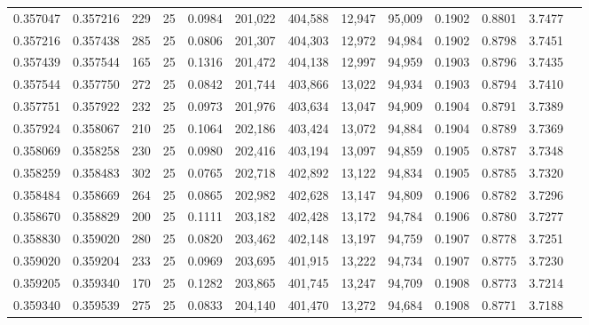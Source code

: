 \begin{tabular}{rrrrrrrrrrrrr}
0.357047 & 0.357216 &   229 &  25 &                                     0.0984 & 201,022 & 404,588 &  12,947 &  95,009 & 0.1902 & 0.8801 & 3.7477 \\
0.357216 & 0.357438 &   285 &  25 &                                     0.0806 & 201,307 & 404,303 &  12,972 &  94,984 & 0.1902 & 0.8798 & 3.7451 \\
0.357439 & 0.357544 &   165 &  25 &                                     0.1316 & 201,472 & 404,138 &  12,997 &  94,959 & 0.1903 & 0.8796 & 3.7435 \\
0.357544 & 0.357750 &   272 &  25 &                                     0.0842 & 201,744 & 403,866 &  13,022 &  94,934 & 0.1903 & 0.8794 & 3.7410 \\
0.357751 & 0.357922 &   232 &  25 &                                     0.0973 & 201,976 & 403,634 &  13,047 &  94,909 & 0.1904 & 0.8791 & 3.7389 \\
0.357924 & 0.358067 &   210 &  25 &                                     0.1064 & 202,186 & 403,424 &  13,072 &  94,884 & 0.1904 & 0.8789 & 3.7369 \\
0.358069 & 0.358258 &   230 &  25 &                                     0.0980 & 202,416 & 403,194 &  13,097 &  94,859 & 0.1905 & 0.8787 & 3.7348 \\
0.358259 & 0.358483 &   302 &  25 &                                     0.0765 & 202,718 & 402,892 &  13,122 &  94,834 & 0.1905 & 0.8785 & 3.7320 \\
0.358484 & 0.358669 &   264 &  25 &                                     0.0865 & 202,982 & 402,628 &  13,147 &  94,809 & 0.1906 & 0.8782 & 3.7296 \\
0.358670 & 0.358829 &   200 &  25 &                                     0.1111 & 203,182 & 402,428 &  13,172 &  94,784 & 0.1906 & 0.8780 & 3.7277 \\
0.358830 & 0.359020 &   280 &  25 &                                     0.0820 & 203,462 & 402,148 &  13,197 &  94,759 & 0.1907 & 0.8778 & 3.7251 \\
0.359020 & 0.359204 &   233 &  25 &                                     0.0969 & 203,695 & 401,915 &  13,222 &  94,734 & 0.1907 & 0.8775 & 3.7230 \\
0.359205 & 0.359340 &   170 &  25 &                                     0.1282 & 203,865 & 401,745 &  13,247 &  94,709 & 0.1908 & 0.8773 & 3.7214 \\
0.359340 & 0.359539 &   275 &  25 &                                     0.0833 & 204,140 & 401,470 &  13,272 &  94,684 & 0.1908 & 0.8771 & 3.7188 \\

\end{tabular}
